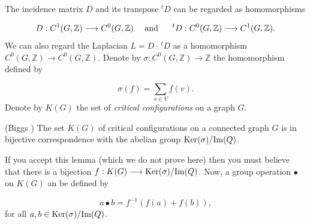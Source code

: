 The
incidence matrix $D$ and its transpose $^tD$ can be regarded as
homomorphisms

\[
D : C^1(G,{\mathbb{Z}})\to C^0(G,{\mathbb{Z}}) \ \ \ \ {\rm and}\ \ \ \ \
^tD : C^0(G,{\mathbb{Z}})\to C^1(G,{\mathbb{Z}}).
\]
We can also regard the Laplacian $L = D\cdot \, ^tD$ as a homomorphism
\index{Laplacian}
$C^0(G,{\mathbb{Z}})\to C^0(G,{\mathbb{Z}})$. Denote by
$\sigma : C^0(G,{\mathbb{Z}})\to {\mathbb{Z}}$ the homomorphism defined by

\[
\sigma(f) = \sum_{v\in V} f(v).
\]
Denote by $K(G)$ the set of {\it critical configurations}
on a graph $G$.

\begin{lemma} (Biggs \cite{Biggs2007})
{\rm
The set $K(G)$ of critical configurations on a connected graph $G$ is in
bijective correspondence with the abelian group
${\rm Ker} (\sigma)/{\rm Im}( Q)$.
}
\end{lemma}

If you accept this lemma (which we do not prove here) then
you must believe that there is a bijection
$f:K(G)\to {\rm Ker} (\sigma)/{\rm Im}( Q)$. Now, a group
operation $\bullet $ on $K(G)$ an be defined by

\[
a\bullet b = f^{-1}(f(a)+f(b)),
\]
for all $a,b\in {\rm Ker} (\sigma)/{\rm Im}( Q)$.

